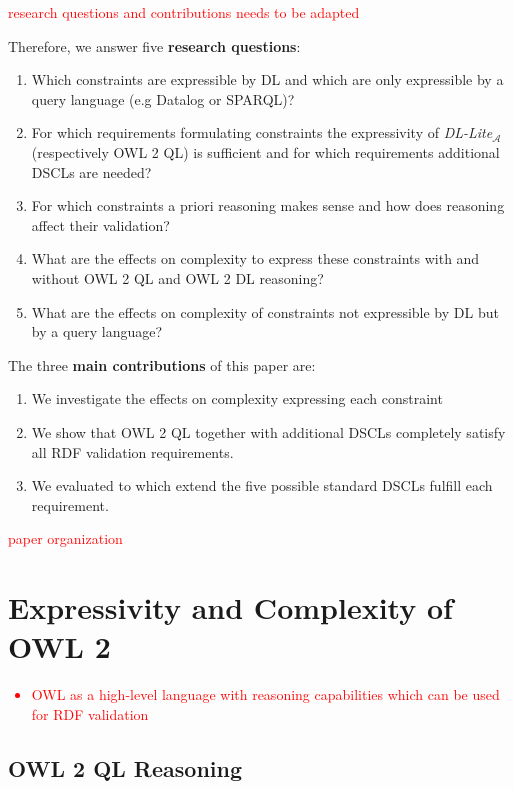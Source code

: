 \documentclass{llncs}
\begin{document}
\textcolor{red}{research questions and contributions needs to be adapted}

Therefore, we answer five \textbf{research questions}:
\begin{enumerate}
	\item Which constraints are expressible by DL and which are only expressible by a query language (e.g Datalog or SPARQL)?
	\item For which requirements formulating constraints the expressivity of \textit{DL-Lite}$_\mathcal{A}$ (respectively OWL 2 QL) is sufficient
	and for which requirements additional DSCLs are needed?
	\item For which constraints a priori reasoning makes sense and how does reasoning affect their validation?  
	\item What are the effects on complexity to express these constraints with and without OWL 2 QL and OWL 2 DL reasoning?
	\item What are the effects on complexity of constraints not expressible by DL but by a query language?
\end{enumerate}

The three \textbf{main contributions} of this paper are:
\begin{enumerate}
  \item We investigate the effects on complexity expressing each constraint
	\item We show that OWL 2 QL together with additional DSCLs completely satisfy all RDF validation requirements.
	\item We evaluated to which extend the five possible standard DSCLs fulfill each requirement.
\end{enumerate}

\textcolor{red}{paper organization}

\section{Expressivity and Complexity of OWL 2}

\textcolor{red}{
\begin{itemize}
	\item OWL as a high-level language with reasoning capabilities which can be used for RDF validation
\end{itemize}
}

\subsection{OWL 2 QL Reasoning}
\end{document}
